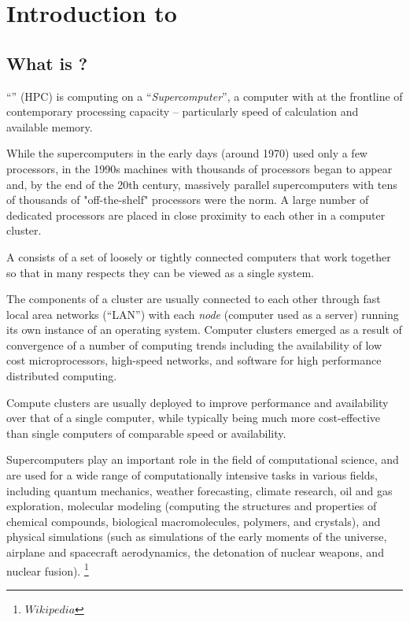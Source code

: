 \chapter{Introduction to \hpc}
\label{ch:introduction-to-hpc}

\section{What is \hpc?}
\label{sec:what-is-hpc}

``'' (HPC) is computing on a
``\emph{Supercomputer}'', a computer with at the frontline of contemporary
processing capacity -- particularly speed of calculation and available memory.

While the supercomputers in the early days (around 1970) used only a few
processors, in the 1990s machines with thousands of processors began to appear
and, by the end of the 20th century, massively parallel supercomputers with
tens of thousands of "off-the-shelf" processors were the norm. A large number
of dedicated processors are placed in close proximity to each other in a
computer cluster.

A  consists of a set of loosely or tightly connected
computers that work together so that in many respects they can be viewed as a
single system.

The components of a cluster are usually connected to each other through fast
local area networks (``LAN'') with each \emph{node} (computer used as a
server) running its own instance of an operating system. Computer clusters
emerged as a result of convergence of a number of computing trends including
the availability of low cost microprocessors, high-speed networks, and software
for high performance distributed computing.

Compute clusters are usually deployed to improve performance and availability
over that of a single computer, while typically being much more cost-effective
than single computers of comparable speed or availability.

Supercomputers play an important role in the field of computational science,
and are used for a wide range of computationally intensive tasks in various
fields, including quantum mechanics, weather forecasting, climate research, oil
and gas exploration, molecular modeling (computing the structures and
properties of chemical compounds, biological macromolecules, polymers, and
crystals), and physical simulations (such as simulations of the early moments
of the universe, airplane and spacecraft aerodynamics, the detonation of
nuclear weapons, and nuclear fusion). \footnote{ $ Wikipedia$ }

